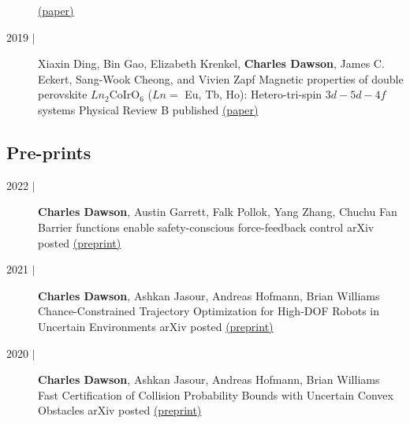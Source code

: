 \documentclass{cv_style}
\newcommand{\me}{\textbf{Charles Dawson}}
\begin{document}
\begin{description}
{                        \href{https://onlinelibrary.wiley.com/doi/full/10.1002/nme.6147}{(paper)}
                    }
                \item[2019 $\vert$]
                        {Xiaxin Ding, Bin Gao, Elizabeth Krenkel, \me, James C. Eckert, Sang-Wook Cheong, and Vivien Zapf}
                        {Magnetic properties of double perovskite $Ln_2\text{CoIrO}_6$ ($Ln = $ Eu, Tb, Ho): Hetero-tri-spin $3d-5d-4f$ systems}
                        {Physical Review B}
                        {published}
                        {
                            \href{https://journals.aps.org/prb/abstract/10.1103/PhysRevB.99.014438}{(paper)}
                        }
        \end{description}

    \subsection{Pre-prints}
        \begin{description}
            \item[2022 $\vert$]
                    {\me, Austin Garrett, Falk Pollok, Yang Zhang, Chuchu Fan}
                    {Barrier functions enable safety-conscious force-feedback control}
                    {arXiv}
                    {posted}
                    {
                        \href{https://arxiv.org/abs/2209.12270}{(preprint)}
                    }
            \item[2021 $\vert$]
                    {\me, Ashkan Jasour, Andreas Hofmann, Brian Williams}
                    {Chance-Constrained Trajectory Optimization for High-DOF Robots in Uncertain Environments}
                    {arXiv}
                    {posted}
                    {
                        \href{https://arxiv.org/abs/2302.00122}{(preprint)}
                    }
            \item[2020 $\vert$]
                    {\me, Ashkan Jasour, Andreas Hofmann, Brian Williams}
                    {Fast Certification of Collision Probability Bounds with Uncertain Convex Obstacles}
                    {arXiv}
                    {posted}
                    {
                        \href{https://arxiv.org/abs/2003.07792}{(preprint)}
                    }
        \end{description}
\end{document}
